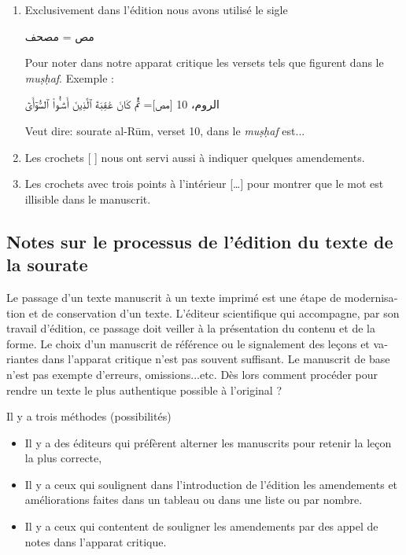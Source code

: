 \documentclass[a4paper,12pt]{report}
\begin{document}
\begin{itemize}
\begin{enumerate}
\begin{french}
\begin{enumerate}
 \item Exclusivement dans l'édition nous avons utilisé le sigle   
\begin{Arabic}
\Large
 مص = مصحف
\end{Arabic}
Pour noter dans notre apparat critique les versets tels que figurent dans le \textit{muṣḥaf}.
Exemple :

\begin{Arabic}
الروم، 10 [مص]= ثُمَّ كَانَ  عَٰقِبَةَ ٱلَّذِينَ أَسَٰٓـُٔواْ ٱلسُّوٓأَىٰٓ
 \end{Arabic}
 
 Veut dire: sourate al-Rūm, verset 10, dans le \textit{muṣḥaf} est... 
    

\item 	Les crochets [ ]   nous ont servi aussi à indiquer quelques amendements. 

\item  Les crochets avec trois points  à l'intérieur […] pour montrer que le mot est illisible dans le manuscrit.



\end{enumerate}

 








\newpage
\begin{french}
    

\subsection{Notes sur le processus  de l’édition du texte de la sourate}

Le passage d’un texte manuscrit à un texte imprimé est une étape de modernisation et de conservation d’un texte. L’éditeur scientifique qui accompagne, par son travail d’édition, ce passage doit veiller à la présentation  du contenu et de  la forme. Le choix d'un manuscrit de référence ou le signalement des leçons et variantes dans l'apparat critique n'est pas souvent suffisant. Le manuscrit de base n'est pas exempte d'erreurs, omissions...etc.  Dès lors comment procéder pour rendre un texte le plus authentique possible à l'original ?

Il y a  trois méthodes (possibilités) 
\begin{itemize}

\item Il y a des éditeurs qui préfèrent alterner les manuscrits  pour retenir la leçon la plus correcte, 
\item Il y a ceux qui soulignent dans l’introduction de l’édition les amendements et améliorations faites dans un tableau ou dans une liste ou par nombre. 
\item Il y a ceux qui contentent de souligner les amendements par des appel de notes dans l'apparat critique. 
    

\end{itemize}
\end{french}
\end{french}
\end{enumerate}
\end{itemize}
\end{document}
